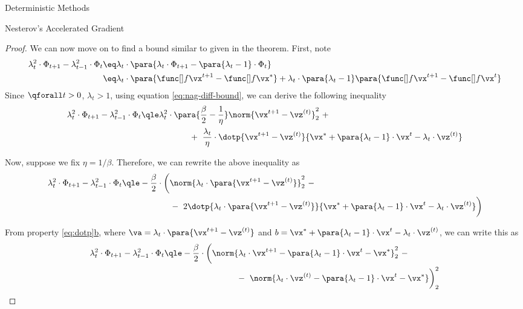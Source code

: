 \documentclass{article}
\begin{document}
\begin{psection}{Deterministic Methods}
\begin{psubsection}{Nesterov's Accelerated Gradient}
\begin{theorem}
\begin{proof}
			We can now move on to find a bound similar to given in the theorem. First, note
			\begin{align*}
				\lambda_t^2 \cdot \Phi_{t + 1} - \lambda_{t - 1}^2 \cdot \Phi_{t}	&\eq	\lambda_t \cdot \para{\lambda_t \cdot \Phi_{t + 1} - \para{\lambda_t - 1} \cdot \Phi_t} \\
				&\eq	\lambda_t \cdot \para{\f{t + 1} - \fs} + \lambda_t \cdot \para{\lambda_t - 1} \para{\f{t + 1} - \f{t}}
			\end{align*}
			Since $\qforall t > 0$, $\lambda_t > 1$, using equation \ref{eq:nag-diff-bound}, we can derive the following inequality
			\begin{align*}
				\lambda_t^2 \cdot \Phi_{t + 1} - \lambda_{t - 1}^2 \cdot \Phi_{t}	&\qle	\lambda_t^2 \cdot \para{\frac{\beta}{2} - \frac{1}{\eta}} \norm{\x{t + 1} - \z{t}}_2^2 \ + \\
				&\hspace{2cm} + \ \frac{\lambda_t}{\eta} \cdot \dotp{\x{t+1} - \z{t}}{\xs + \para{\lambda_t - 1} \cdot \x{t} - \lambda_t \cdot \z{t}}
			\end{align*}

			Now, suppose we fix $\eta = 1 / \beta$. Therefore, we can rewrite the above inequality as
			\begin{align*}
				\lambda_t^2 \cdot \Phi_{t + 1} - \lambda_{t - 1}^2 \cdot \Phi_{t}	&\qle	- \frac{\beta}{2} \cdot \bigg( \norm{\lambda_t \cdot \para{\x{t + 1} - \z{t}}}_2^2 \ - \\
				&\hspace{2cm} - \ 2 \dotp{\lambda_t \cdot \para{\x{t+1} - \z{t}}}{\xs + \para{\lambda_t - 1} \cdot \x{t} - \lambda_t \cdot \z{t}} \bigg)
			\end{align*}

			From property \hyperref[eq:dotp]{\ref*{eq:dotp}b}, where $\va = \lambda_t \cdot \para{\x{t + 1} - \z{t}}$ and $b = \xs + \para{\lambda_t - 1} \cdot \x{t} - \lambda_t \cdot \z{t}$, we can write this as
			\begin{align}
				\lambda_t^2 \cdot \Phi_{t + 1} - \lambda_{t - 1}^2 \cdot \Phi_{t}	&\qle	- \frac{\beta}{2} \cdot \bigg( \norm{\lambda_t \cdot \x{t + 1} - \para{\lambda_t - 1} \cdot \x{t} - \xs}_2^2 \ - \nonumber \\
				&\hspace{3cm} - \ \norm{\lambda_t \cdot \z{t} - \para{\lambda_t - 1} \cdot \x{t} - \xs} \bigg)_2^2
				\label{eq:nag-diff}
			\end{align}


\end{proof}
\end{theorem}
\end{psubsection}
\end{psection}
\end{document}
